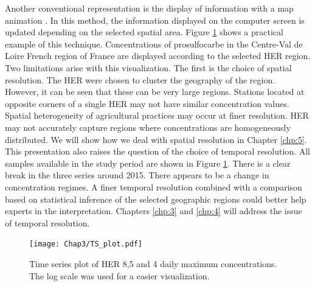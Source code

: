 Another conventional representation is the display of information with a map animation \cite{Andrienko2003}. In this method, the information displayed on the computer screen is updated depending on the selected spatial area. Figure \ref{fig:tsplot_ex} shows a practical example of this technique. Concentrations of prosulfocarbe in the Centre-Val de Loire French region of France are displayed according to the selected HER region. Two limitations arise with this visualization. The first is the choice of spatial resolution. The HER were chosen to cluster the geography of the region. However, it can be seen that these can be very large regions. Stations located at opposite corners of a single HER may not have similar concentration values. Spatial heterogeneity of agricultural practices may occur at finer resolution. HER may not accurately capture regions where concentrations are homogeneously distributed. We will show how we deal with spatial resolution in Chapter \ref{chp:5}. This presentation also raises the question of the choice of temporal resolution. All samples available in the study period are shown in Figure \ref{fig:tsplot_ex}. There is a clear break in the three series around 2015. There appears to be a change in concentration regimes. A finer temporal resolution combined with a comparison based on statistical inference of the selected geographic regions could better help experts in the interpretation. Chapters \ref{chp:3} and \ref{chp:4} will address the issue of temporal resolution.

\begin{figure}[ht]
    \centering
    \texttt{[image: Chap3/TS\_plot.pdf]}
    \caption{Time series plot of HER 8,5 and 4 daily maximum concentrations. The log scale was used for a easier visualization.}
    \label{fig:tsplot_ex}
\end{figure}





 
 


